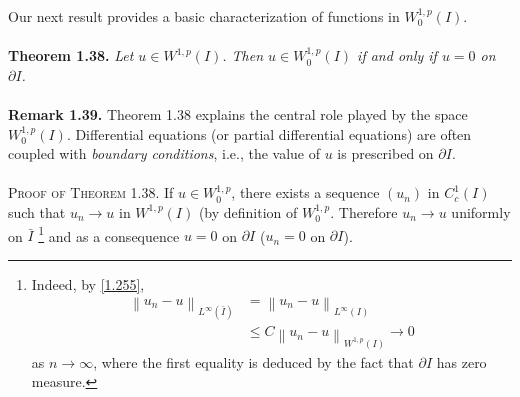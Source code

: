\documentclass[a4paper,oneside]{book}
\numberwithin{equation}{chapter}
\begin{document}
Our next result provides a basic characterization of functions in $W_0^{1,p}\left(I\right)$.\\
\\
\textbf{Theorem 1.38.} \textit{Let $u\in W^{1,p}\left(I\right)$. Then $u\in W_0^{1,p}\left(I\right)$ if and only if $u=0$ on $\partial I$.}\\
\\
\textbf{Remark 1.39.} Theorem 1.38 explains the central role played by the space $W_0^{1,p}\left(I\right)$. Differential equations (or partial differential equations) are often coupled with \textit{boundary conditions}, i.e., the value of $u$ is prescribed on $\partial I$.\\
\\
\textsc{Proof of Theorem 1.38.} If $u\in W_0^{1,p}$, there exists a sequence $\left(u_n\right)$ in $C_c^1\left(I\right)$ such that $u_n\to u$ in $W^{1,p}\left(I\right)$ (by definition of $W_0^{1,p}$. Therefore $u_n\to u$ uniformly on $\bar{I}$  \footnote{Indeed, by \eqref{1.255}, 
\begin{align}
{\left\| {{u_n} - u} \right\|_{{L^\infty }\left( {\bar I} \right)}} &= {\left\| {{u_n} - u} \right\|_{{L^\infty }\left( I \right)}}\\
 &\le C{\left\| {{u_n} - u} \right\|_{{W^{1,p}}\left( I \right)}} \to 0
\end{align}
as $n\to \infty$, where the first equality is deduced by the fact that $\partial I$ has zero measure.} and as a consequence $u=0$ on $\partial I$ ($u_n=0$ on $\partial I$).
\end{document}
